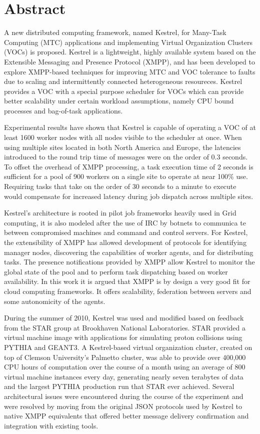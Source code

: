 \chapter*{Abstract}

A new distributed computing framework, named Kestrel, for Many-Task Computing
(MTC) applications and implementing Virtual Organization Clusters (VOCs) is
proposed. Kestrel is a lightweight, highly available system based on the
Extensible Messaging and Presence Protocol (XMPP), and has been developed to
explore XMPP-based techniques for improving MTC and VOC tolerance to faults due
to scaling and intermittently connected heterogeneous resoureces. Kestrel provides
a VOC with a special purpose scheduler for VOCs which can provide better scalability
under certain workload assumptions, namely CPU bound processes and bag-of-task
applications.

Experimental results have shown that Kestrel is capable of operating
a VOC of at least 1600 worker nodes with all nodes visible to the
scheduler at once. When using multiple sites located in both North
America and Europe, the latencies introduced to the round trip time
of messages were on the order of 0.3 seconds. To offset the overhead
of XMPP processing, a task execution time of 2 seconds is sufficient
for a pool of 900 workers on a single site to operate at near 100\%
use. Requiring tasks that take on the order of 30 seconds to a minute
to execute would compensate for increased latency during job dispatch
across multiple sites.

Kestrel's architecture is rooted in pilot job frameworks heavily used in Grid
computing, it is also modeled after the use of IRC by botnets to communica te
between compromised machines and command and control servers. For Kestrel, the
extensibility of XMPP has allowed development of protocols for identifying
manager nodes, discovering the capabilities of worker agents, and for
distributing tasks. The presence notifications provided by XMPP allow Kestrel
to monitor the global state of the pool and to perform task dispatching based
on worker availability. In this work it is argued that XMPP is by design a very
good fit for cloud computing frameworks. It offers scalability, federation
between servers and some autonomicity of the agents.

During the summer of 2010, Kestrel was used and modified based on feedback from
the STAR group at Brookhaven National Laboratories. STAR provided a virtual
machine image with applications for simulating proton collisions using PYTHIA
and GEANT3. A Kestrel-based virtual organization cluster, created on top of
Clemson University's Palmetto cluster, was able to provide over 400,000 CPU
hours of computation over the course of a month using an average of 800 virtual
machine instances every day, generating nearly seven terabytes of data and the
largest PYTHIA production run that STAR ever achieved. Several architectural
issues were encountered during the course of the experiment and were resolved
by moving from the original JSON protocols used by Kestrel to native XMPP
equivalents that offered better message delivery confirmation and integration
with existing tools.
